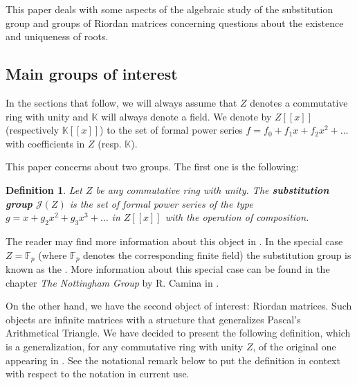 \documentclass[preprint,12pt]{elsarticle}
\newtheorem{defi}{Definition}
\begin{document}
This paper deals with some aspects of the algebraic study of the substitution group and groups of Riordan matrices concerning questions about the existence and uniqueness of roots.


\subsection{Main groups of interest}

In the sections that follow, we will always assume that $Z$ denotes a commutative ring with unity and $\mathbb K$ will always denote a field. We denote by $Z[[x]]$ (respectively $\mathbb K[[x]]$) to the set of formal power series $f=f_0+f_1x+f_2x^2+\ldots$ with coefficients in $Z$ (resp. $\mathbb K$).

\medskip

This paper concerns about two groups. The first one is the following:

\begin{defi} Let $Z$ be any commutative ring with unity. The \textbf{substitution group} $\mathcal J(Z)$ is the set of formal power series of the type $g=x+g_2x^2+g_3x^3+\ldots$ in $Z[[x]]$  with the operation of composition. 
\end{defi}



The reader may find more information about this object in \cite{B, Jen, J}.  In the special case $Z=\mathbb F_p$ (where $\mathbb F_p$ denotes the corresponding  finite field) the substitution group is known as the . More information about this special case can be found in the chapter \emph{The Nottingham Group} by R. Camina in \cite{SSS}.







\medskip

On the other hand, we have the second object of interest: Riordan matrices. Such objects are infinite matrices with a structure that generalizes Pascal's Arithmetical Triangle. We have decided to present the following definition, which is a generalization, for any commutative ring with unity $Z$, of the original one appearing in \cite{SGWW}. See the notational remark below to put the definition in context with respect to the notation in current use.
\end{document}

